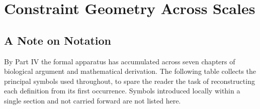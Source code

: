 \documentclass[12pt, a4paper, openany]{book}
\theoremstyle{definition}
\theoremstyle{remark}
\begin{document}

\chapter{Constraint Geometry Across Scales}

\section{A Note on Notation}

By Part IV the formal apparatus has accumulated across seven chapters of biological argument and mathematical derivation. The following table collects the principal symbols used throughout, to spare the reader the task of reconstructing each definition from its first occurrence. Symbols introduced locally within a single section and not carried forward are not listed here.

\medskip
\end{document}

